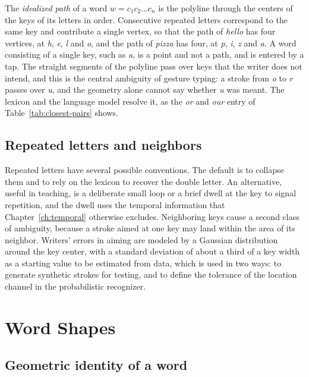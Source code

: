 The \emph{idealized path} of a word $w=c_1c_2\dots c_n$ is the polyline through the centers of the keys of its letters in order. Consecutive repeated letters correspond to the same key and contribute a single vertex, so that the path of \textit{hello} has four vertices, at \textit{h}, \textit{e}, \textit{l} and \textit{o}, and the path of \textit{pizza} has four, at \textit{p}, \textit{i}, \textit{z} and \textit{a}. A word consisting of a single key, such as \textit{a}, is a point and not a path, and is entered by a tap. The straight segments of the polyline pass over keys that the writer does not intend, and this is the central ambiguity of gesture typing: a stroke from \textit{o} to \textit{r} passes over \textit{u}, and the geometry alone cannot say whether \textit{u} was meant. The lexicon and the language model resolve it, as the \textit{or} and \textit{our} entry of Table~\ref{tab:closest-pairs} shows.

\section{Repeated letters and neighbors}

Repeated letters have several possible conventions. The default is to collapse them and to rely on the lexicon to recover the double letter. An alternative, useful in teaching, is a deliberate small loop or a brief dwell at the key to signal repetition, and the dwell uses the temporal information that Chapter~\ref{ch:temporal} otherwise excludes. Neighboring keys cause a second class of ambiguity, because a stroke aimed at one key may land within the area of its neighbor. Writers' errors in aiming are modeled by a Gaussian distribution around the key center, with a standard deviation of about a third of a key width as a starting value to be estimated from data,\evH{} which is used in two ways: to generate synthetic strokes for testing, and to define the tolerance of the location channel in the probabilistic recognizer.

\chapter{Word Shapes}\label{ch:word-shapes}

\section{Geometric identity of a word}

